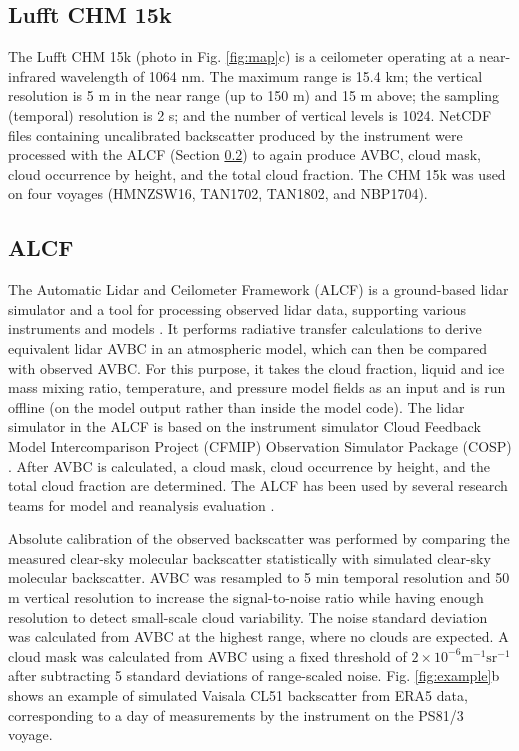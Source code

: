 \documentclass[draft]{agujournal2019}
\begin{document}
\subsection{Lufft CHM 15k}
\label{sec:chm15k}

The Lufft CHM 15k (photo in Fig. \ref{fig:map}c) is a ceilometer operating at a near-infrared wavelength of 1064 nm. The maximum range is 15.4 km; the vertical resolution is 5 m in the near range (up to 150 m) and 15 m above; the sampling (temporal) resolution is 2 s; and the number of vertical levels is 1024. NetCDF files containing uncalibrated backscatter produced by the instrument were processed with the ALCF (Section \ref{sec:alcf}) to again produce AVBC, cloud mask, cloud occurrence by height, and the total cloud fraction. The CHM 15k was used on four voyages (HMNZSW16, TAN1702, TAN1802, and NBP1704).

\subsection{ALCF}
\label{sec:alcf}

The Automatic Lidar and Ceilometer Framework (ALCF) is a ground-based lidar simulator and a tool for processing observed lidar data, supporting various instruments and models \cite{kuma2021}. It performs radiative transfer calculations to derive equivalent lidar AVBC in an atmospheric model, which can then be compared with observed AVBC. For this purpose, it takes the cloud fraction, liquid and ice mass mixing ratio, temperature, and pressure model fields as an input and is run offline (on the model output rather than inside the model code). The lidar simulator in the ALCF is based on the instrument simulator Cloud Feedback Model Intercomparison Project (CFMIP) Observation Simulator Package (COSP) \cite{bodas-salcedo2011}. After AVBC is calculated, a cloud mask, cloud occurrence by height, and the total cloud fraction are determined. The ALCF has been used by several research teams for model and reanalysis evaluation \cite{kuma2020,kremser2021,guyot2022,pei2023,whitehead2023,mcdonald2024}.

Absolute calibration of the observed backscatter was performed by comparing the measured clear-sky molecular backscatter statistically with simulated clear-sky molecular backscatter. AVBC was resampled to 5 min temporal resolution and 50 m vertical resolution to increase the signal-to-noise ratio while having enough resolution to detect small-scale cloud variability. The noise standard deviation was calculated from AVBC at the highest range, where no clouds are expected. A cloud mask was calculated from AVBC using a fixed threshold of $\mathrm{2\times 10^{-6} m^{-1}sr^{-1}}$ after subtracting 5 standard deviations of range-scaled noise. Fig. \ref{fig:example}b shows an example of simulated Vaisala CL51 backscatter from ERA5 data, corresponding to a day of measurements by the instrument on the PS81/3 voyage.
\end{document}
